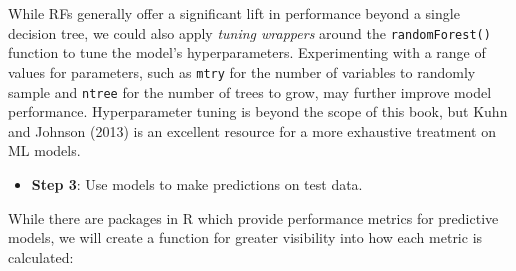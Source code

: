 \documentclass[
]{book}
\providecommand{\tightlist}{%
  \setlength{\itemsep}{0pt}\setlength{\parskip}{0pt}}
\begin{document}
While RFs generally offer a significant lift in performance beyond a single decision tree, we could also apply \emph{tuning wrappers} around the \texttt{randomForest()} function to tune the model's hyperparameters. Experimenting with a range of values for parameters, such as \texttt{mtry} for the number of variables to randomly sample and \texttt{ntree} for the number of trees to grow, may further improve model performance. Hyperparameter tuning is beyond the scope of this book, but Kuhn and Johnson (2013) is an excellent resource for a more exhaustive treatment on ML models.

\begin{itemize}
\tightlist
\item
  \textbf{Step 3}: Use models to make predictions on test data.
\end{itemize}

While there are packages in R which provide performance metrics for predictive models, we will create a function for greater visibility into how each metric is calculated:
\end{document}
